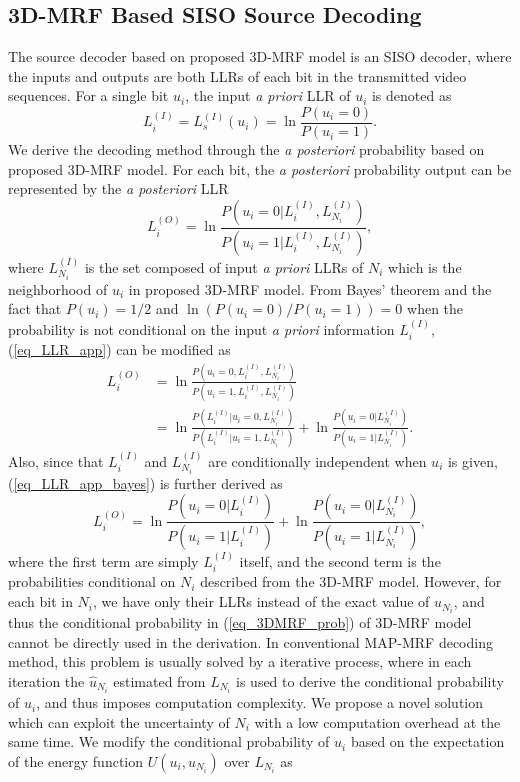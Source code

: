 \documentclass[10pt,twocolumn,twoside]{IEEEtran}
\begin{document}
\subsection{3D-MRF Based SISO Source Decoding}\label{subsec_3DMRF_SISO}
The source decoder based on proposed 3D-MRF model is an SISO decoder, where the inputs and outputs are both LLRs of each bit in the transmitted video sequences. For a single bit $u_i$, the input {\it a priori} LLR of $u_i$ is denoted as
\begin{equation}
L_i^{(I)} = L_s^{(I)}(u_i) = \ln \frac{P(u_i = 0)}{P(u_i = 1)}.
\end{equation}
We derive the decoding method through the {\it a posteriori} probability based on proposed 3D-MRF model. For each bit, the {\it a posteriori} probability output can be represented by the {\it a posteriori} LLR
\begin{equation}
L_i^{(O)} =\ln \frac{P(u_i = 0 | L^{(I)}_i, L^{(I)}_{N_i})}{P(u_i = 1 | L^{(I)}_i, L^{(I)}_{N_i})},
\label{eq_LLR_app}
\end{equation}
where $L_{N_i}^{(I)}$ is the set composed of input {\it a priori} LLRs of $N_i$ which is the neighborhood of $u_i$ in proposed 3D-MRF model. From Bayes' theorem and the fact that $P(u_i) = 1/2$ and $\ln(P(u_i=0)/P(u_i  =1)) = 0$ when the probability is not conditional on the input {\it a priori} information $L^{(I)}_i$, (\ref{eq_LLR_app}) can be modified as
\begin{align}
L_i^{(O)} &= \ln \frac{P(u_i = 0, L^{(I)}_i, L^{(I)}_{N_i})}{P(u_i = 1, L^{(I)}_i, L^{(I)}_{N_i})}\nonumber  \\
&= \ln \frac{P(L^{(I)}_i | u_i = 0,  L^{(I)}_{N_i})}{P(L^{(I)}_i | u_i = 1,  L^{(I)}_{N_i})} + \ln \frac{P(u_i = 0 | L^{(I)}_{N_i})}{P(u_i = 1 | L^{(I)}_{N_i})}.
\label{eq_LLR_app_bayes}
\end{align}
Also, since that $L^{(I)}_i$ and $L^{(I)}_{N_i}$ are conditionally independent when $u_i$ is given, (\ref{eq_LLR_app_bayes}) is further derived as
\begin{equation}
L_i^{(O)} = \ln \frac{P(u_i = 0| L^{(I)}_i)}{P(u_i = 1|L^{(I)}_i)} + \ln \frac{P(u_i = 0| L^{(I)}_{N_i})}{P(u_i = 1|L^{(I)}_{N_i})},
\end{equation}
where the first term are simply $L_i^{(I)}$ itself, and the second term is the probabilities conditional on $N_i$ described from the 3D-MRF model. However, for each bit in $N_i$, we have only their LLRs instead of the exact value of $u_{N_i}$, and thus the conditional probability in (\ref{eq_3DMRF_prob}) of 3D-MRF model cannot be directly used in the derivation. In conventional MAP-MRF decoding method, this problem is usually solved by a iterative process, where in each iteration the $\hat{u}_{N_i}$ estimated from $L_{N_i}$ is used to derive the conditional probability of $u_i$, and thus imposes computation complexity. We propose a novel solution which can exploit the uncertainty of $N_i$ with a low computation overhead at the same time. We modify the conditional probability of $u_i$ based on the expectation of the energy function $U(u_i, u_{N_i})$ over $L_{N_i}$ as
\end{document}

